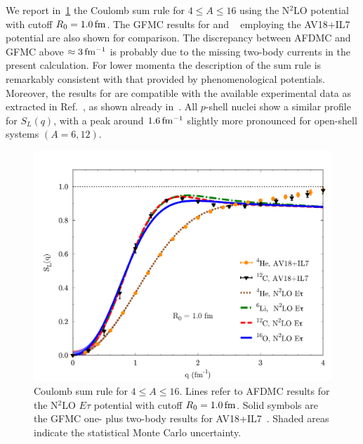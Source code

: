 \documentclass[aps,prc,twocolumn,superscriptaddress,showpacs,floatfix,nofootinbib]{revtex4-1}
\begin{document}
We report in~\cref{fig:sl} the Coulomb sum rule for $4\le A\le16$ using the N$^2$LO potential
with cutoff $R_0=1.0\,\rm fm$. The GFMC results for  
and ~\cite{Lovato:2013,Lonardoni:2017cvmc} employing the AV18+IL7 potential are also shown for comparison.
The discrepancy between AFDMC and GFMC above $\approx 3\,\rm fm^{-1}$ is probably due
to the missing two-body currents in the present calculation. For lower momenta the description of the sum rule 
is remarkably consistent with that provided by phenomenological potentials. 
Moreover, the results for  are 
compatible with the available experimental data as extracted in Ref.~\cite{Lovato:2016}, 
as shown already in~\cite{Lonardoni:2017afdmc}. 
All $p$-shell nuclei show a similar profile for $S_L(q)$, with a peak around 
$1.6\,\rm fm^{-1}$ slightly more pronounced for open-shell systems $(A=6,12)$.

\begin{figure}[htb]
\includegraphics[width=\linewidth]{sl.pdf}
\caption[]{Coulomb sum rule for $4\le A\le16$.
Lines refer to AFDMC results for the N$^2$LO $E\tau$ potential with cutoff $R_0=1.0\,\rm fm$.
Solid symbols are the GFMC one- plus two-body results for AV18+IL7~\cite{Lovato:2013,Lonardoni:2017cvmc}. 
Shaded areas indicate the statistical Monte Carlo uncertainty.}
\label{fig:sl}
\end{figure}
\end{document}
